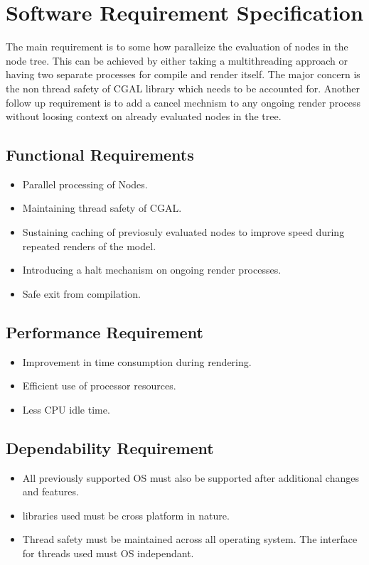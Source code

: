 \section{Software Requirement Specification}
The main requirement is to some how paralleize the evaluation of nodes in the node tree. This can be achieved by either taking a multithreading approach or having two separate processes for compile and render itself. The major concern is the non thread safety of CGAL library which needs to be accounted for.
Another follow up requirement is to add a cancel mechnism to any ongoing render process without loosing context on already evaluated nodes in the tree.

\subsection{Functional Requirements}
\begin{itemize}
	\item Parallel processing of Nodes.
	\item Maintaining thread safety of CGAL.
	\item Sustaining caching of previosuly evaluated nodes to improve speed during repeated renders of the model.
	\item Introducing a halt mechanism on ongoing render processes.
	\item Safe exit from compilation.
\end{itemize}

\subsection{Performance Requirement}
\begin{itemize}
	\item Improvement in time consumption during rendering.
	\item Efficient use of processor resources.
	\item Less CPU idle time.
\end{itemize}

\subsection{Dependability Requirement}
\begin{itemize}
	\item All previously supported OS must also be supported after additional changes and features.
	\item libraries used must be cross platform in nature.
	\item Thread safety must be maintained across all operating system. The interface for threads used must OS independant.
\end{itemize}
